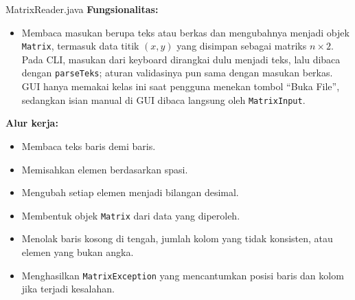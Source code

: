 \begin{kelas}{MatrixReader.java}
\textbf{Fungsionalitas:}
\begin{itemize}
\item Membaca masukan berupa teks atau berkas dan mengubahnya menjadi objek \texttt{Matrix}, termasuk data titik $(x,y)$ yang disimpan sebagai matriks $n \times 2$. Pada CLI, masukan dari keyboard dirangkai dulu menjadi teks, lalu dibaca dengan \texttt{parseTeks}; aturan validasinya pun sama dengan masukan berkas. GUI hanya memakai kelas ini saat pengguna menekan tombol ``Buka File'', sedangkan isian manual di GUI dibaca langsung oleh \texttt{MatrixInput}.
\end{itemize}

\textbf{Alur kerja:}
\begin{itemize}
\item Membaca teks baris demi baris.
\item Memisahkan elemen berdasarkan spasi.
\item Mengubah setiap elemen menjadi bilangan desimal.
\item Membentuk objek \texttt{Matrix} dari data yang diperoleh.
\item Menolak baris kosong di tengah, jumlah kolom yang tidak konsisten, atau elemen yang bukan angka.
\item Menghasilkan \texttt{MatrixException} yang mencantumkan posisi baris dan kolom jika terjadi kesalahan.
\end{itemize}
 
\end{kelas}

